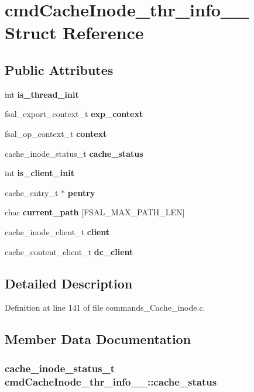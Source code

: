 \section{cmdCacheInode\_\-thr\_\-info\_\-\_\- Struct Reference}
\label{structcmdCacheInode__thr__info____}
\subsection*{Public Attributes}
\begin{CompactItemize}
\item 
int {\bf is\_\-thread\_\-init}
\item 
fsal\_\-export\_\-context\_\-t {\bf exp\_\-context}
\item 
fsal\_\-op\_\-context\_\-t {\bf context}
\item 
cache\_\-inode\_\-status\_\-t {\bf cache\_\-status}
\item 
int {\bf is\_\-client\_\-init}
\item 
cache\_\-entry\_\-t $\ast$ {\bf pentry}
\item 
char {\bf current\_\-path} [FSAL\_\-MAX\_\-PATH\_\-LEN]
\item 
cache\_\-inode\_\-client\_\-t {\bf client}
\item 
cache\_\-content\_\-client\_\-t {\bf dc\_\-client}
\end{CompactItemize}


\subsection{Detailed Description}


Definition at line 141 of file commands\_\-Cache\_\-inode.c.

\subsection{Member Data Documentation}
\subsubsection[{cache\_\-status}]{\setlength{\rightskip}{0pt plus 5cm}cache\_\-inode\_\-status\_\-t {\bf cmdCacheInode\_\-thr\_\-info\_\-\_\-::cache\_\-status}}\label{structcmdCacheInode__thr__info_____da0c4f4e3dd68e629dfb3675f814e4b7}


